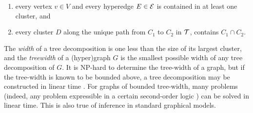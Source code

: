 \documentclass{article}
\newcommand\otodo[2][]{\todo[color=olicolor!30!white,#1]{#2}}
\begin{document}
\begin{enumerate}[nosep]
    \item every vertex $v \in V$ and every hyperedge $E \in \mathcal E$ is contained in at least one cluster, and
        \item every cluster $D$ along the unique path from $C_1$ to $C_2$ in $\cal T$,
         contains $C_1 \cap C_2$.
\end{enumerate}

The \emph{width} of a tree decomposition is one less than the size of its largest cluster,
and the \emph{treewidth} of a (hyper)graph $G$ is the smallest possible width of any tree decomposition of $G$.
It is NP-hard to determine the tree-width of a graph, but
if the tree-width is known to be bounded above, a tree decomposition may be constructed in linear time \parencite{bodlaender1993linear}.
For graphs of bounded tree-width, many problems 
(indeed, any problem expressible in a certain second-order logic \parencite{courcelle1990})
can be solved in
linear time.
This is also true of inference in 
standard graphical models.
\end{document}
